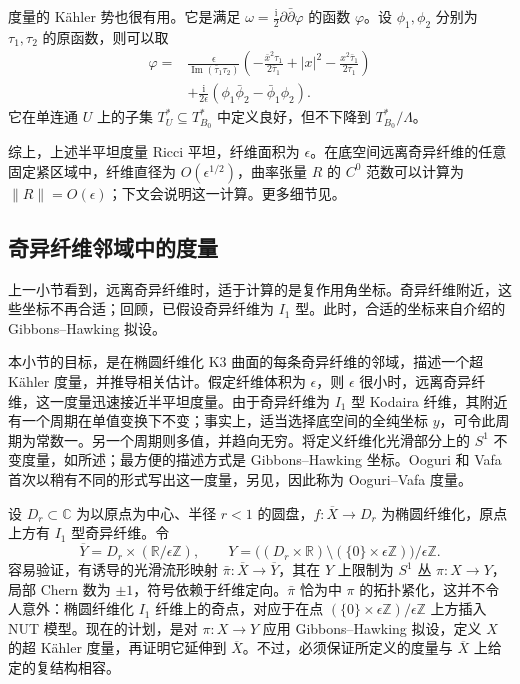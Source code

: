 度量的 Kähler 势也很有用。它是满足 $\omega=\tfrac{\mathrm i}{2}\partial\bar\partial\varphi$ 的函数 $\varphi$。设 $\phi_1,\phi_2$ 分别为 $\tau_1,\tau_2$ 的原函数，则可以取
\[
\begin{aligned}
\varphi={}&\frac\epsilon{\operatorname{Im}(\bar\tau_1\tau_2)}
\left(-\frac{\bar x^2\tau_1}{2\bar\tau_1}
+|x|^2-\frac{x^2\bar\tau_1}{2\tau_1}\right)\\
&+\frac{\mathrm i}{2\epsilon}
(\phi_1\bar\phi_2-\bar\phi_1\phi_2).
\end{aligned}
\]
它在单连通 $U$ 上的子集 $T^*_U\subseteq T^*_{B_0}$ 中定义良好，但不下降到 $T^*_{B_0}/\Lambda$。

综上，上述半平坦度量 Ricci 平坦，纤维面积为 $\epsilon$。在底空间远离奇异纤维的任意固定紧区域中，纤维直径为 $O(\epsilon^{1/2})$，曲率张量 $R$ 的 $C^0$ 范数可以计算为 $\|R\|=O(\epsilon)$；下文会说明这一计算。更多细节见。

\subsection{奇异纤维邻域中的度量}\label{sec:7.3.4}

上一小节看到，远离奇异纤维时，适于计算的是复作用角坐标。奇异纤维附近，这些坐标不再合适；回顾，已假设奇异纤维为 $I_1$ 型。此时，合适的坐标来自介绍的 Gibbons--Hawking 拟设。

本小节的目标，是在椭圆纤维化 K3 曲面的每条奇异纤维的邻域，描述一个超 Kähler 度量，并推导相关估计。假定纤维体积为 $\epsilon$，则 $\epsilon$ 很小时，远离奇异纤维，这一度量迅速接近半平坦度量。由于奇异纤维为 $I_1$ 型 Kodaira 纤维，其附近有一个周期在单值变换下不变；事实上，适当选择底空间的全纯坐标 $y$，可令此周期为常数一。另一个周期则多值，并趋向无穷。将定义纤维化光滑部分上的 $S^1$ 不变度量，如所述；最方便的描述方式是 Gibbons--Hawking 坐标。Ooguri 和 Vafa首次以稍有不同的形式写出这一度量，另见，因此称为 Ooguri--Vafa 度量。

设 $D_r\subset\mathbb C$ 为以原点为中心、半径 $r<1$ 的圆盘，$f\colon\overline X\to D_r$ 为椭圆纤维化，原点上方有 $I_1$ 型奇异纤维。令
\[
\overline Y=D_r\times(\mathbb R/\epsilon\mathbb Z),\qquad
Y=\bigl((D_r\times\mathbb R)\setminus(\{0\}\times\epsilon\mathbb Z)\bigr)/\epsilon\mathbb Z.
\]
容易验证，有诱导的光滑流形映射 $\bar\pi\colon\overline X\to\overline Y$，其在 $Y$ 上限制为 $S^1$ 丛 $\pi\colon X\to Y$，局部 Chern 数为 $\pm1$，符号依赖于纤维定向。$\bar\pi$ 恰为中 $\pi$ 的拓扑紧化，这并不令人意外：椭圆纤维化 $I_1$ 纤维上的奇点，对应于在点 $(\{0\}\times\epsilon\mathbb Z)/\epsilon\mathbb Z$ 上方插入 NUT 模型。现在的计划，是对 $\pi\colon X\to Y$ 应用 Gibbons--Hawking 拟设，定义 $X$ 的超 Kähler 度量，再证明它延伸到 $\overline X$。不过，必须保证所定义的度量与 $\overline X$ 上给定的复结构相容。

